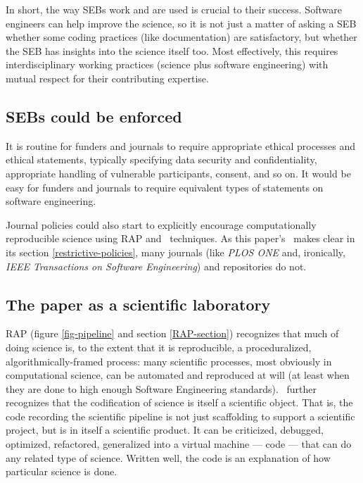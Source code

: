 \documentclass{comjnl}
\begin{document}
\begin{change}
In short, the way SEBs work and are used is crucial to their success. Software engineers can help improve the science, so it is not just a matter of asking a SEB  whether some coding practices (like documentation) are satisfactory, but whether the SEB has insights into the science itself too. Most effectively, this requires interdisciplinary working practices (science plus software engineering) with mutual respect for their contributing expertise.

\subsection{SEBs could be enforced}
It is routine for funders and journals to require appropriate ethical processes and ethical statements, typically specifying data security and confidentiality, appropriate handling of vulnerable participants, consent, and so on. It would be easy for funders and journals to require equivalent types of statements on software engineering.

Journal policies could also start to explicitly encourage computationally reproducible science using RAP and \RAPstar\ techniques. As this paper's \supplement\ makes clear in its section \ref{restrictive-policies}, many journals (like \emph{PLOS ONE\/} and, ironically, \emph{IEEE Transactions on Software Engineering\/}) and repositories do not.

\subsection{The paper as a scientific laboratory}
RAP (figure \ref{fig-pipeline} and section \ref{RAP-section}) recognizes that much of doing science is, to the extent that it is reproducible, a proceduralized, algorithmically-framed process: many scientific processes, most obviously in computational science, can be automated and reproduced at will (at least when they are done to high enough Software Engineering standards). \RAPstar\ further recognizes that the codification of science is itself a scientific object. That is, the code recording the scientific pipeline is not just scaffolding to support a scientific project, but is in itself a scientific product. It can be criticized, debugged, optimized, refactored, generalized into a virtual machine --- code --- that can do any related type of science. Written well, the code is an explanation of how particular science is done. 


\end{change}
\end{document}

